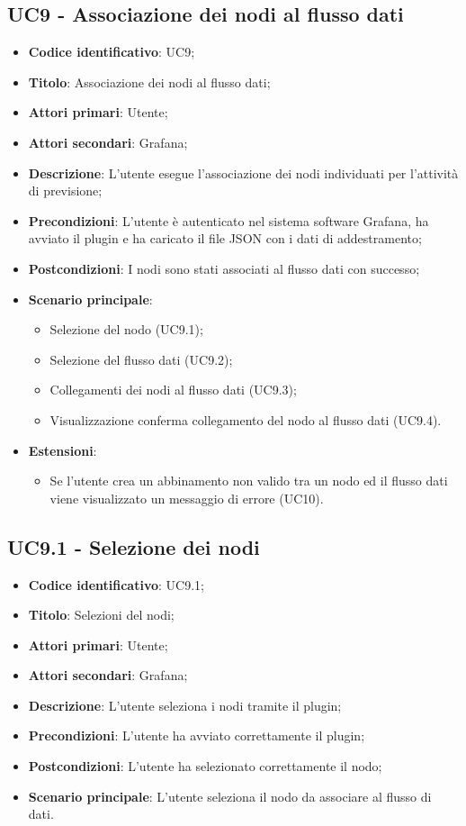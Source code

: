 \subsection{UC9 - Associazione dei nodi al flusso dati}
\begin{itemize}
	\item \textbf{Codice identificativo}: UC9;
	\item \textbf{Titolo}: Associazione dei nodi al flusso dati;
	\item \textbf{Attori primari}: Utente;
	\item \textbf{Attori secondari}: Grafana\glo;
	\item \textbf{Descrizione}: L'utente esegue l'associazione dei nodi individuati per l'attività di previsione;
	\item \textbf{Precondizioni}: L'utente è autenticato nel sistema software Grafana\glosp, ha avviato il plugin e ha caricato il file JSON con i dati di addestramento;
	\item \textbf{Postcondizioni}: I nodi sono stati associati al flusso dati con successo;
	\item \textbf{Scenario principale}: 
		\begin{itemize}
			\item Selezione del nodo (UC9.1);
			\item Selezione del flusso dati (UC9.2);
			\item Collegamenti dei nodi al flusso dati (UC9.3);
			\item Visualizzazione conferma collegamento del nodo al flusso dati (UC9.4).
		\end{itemize}
	\item \textbf{Estensioni}:
		\begin{itemize}
			\item Se l'utente crea un abbinamento non valido tra un nodo ed il flusso dati viene visualizzato un messaggio di errore (UC10).
		\end{itemize}
\end{itemize}

\subsection{UC9.1 - Selezione dei nodi}
\begin{itemize}
	\item \textbf{Codice identificativo}: UC9.1;
	\item \textbf{Titolo}: Selezioni del nodi;
	\item \textbf{Attori primari}: Utente;
	\item \textbf{Attori secondari}: Grafana\glo;
	\item \textbf{Descrizione}: L'utente seleziona i nodi tramite il plugin;
	\item \textbf{Precondizioni}: L'utente ha avviato correttamente il plugin;
	\item \textbf{Postcondizioni}: L'utente ha selezionato correttamente il nodo;
	\item \textbf{Scenario principale}: L'utente seleziona il nodo da associare al flusso di dati.
\end{itemize}

